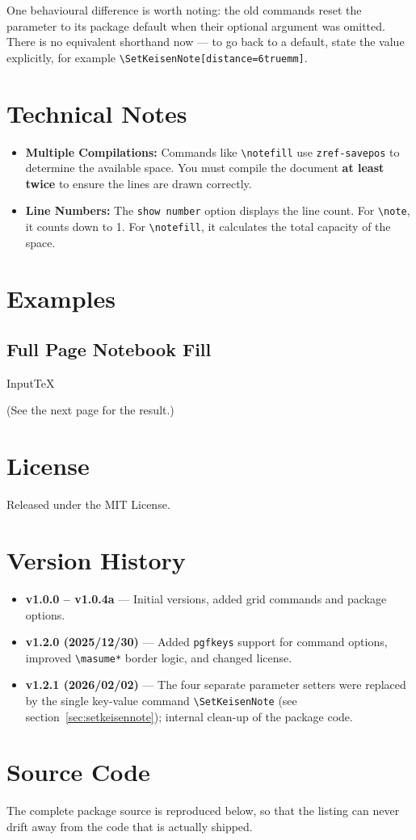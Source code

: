 \documentclass[luatex,fontsize=8pt,paper=b5,twoside]{jlreq}%
\begin{document}
One behavioural difference is worth noting: the old commands reset the parameter to
its package default when their optional argument was omitted. There is no equivalent
shorthand now --- to go back to a default, state the value explicitly, for example
\texttt{\textbackslash SetKeisenNote[distance=6truemm]}.

\section{Technical Notes}
\begin{itemize}
  \item \textbf{Multiple Compilations:} Commands like \texttt{\textbackslash notefill} use \texttt{zref-savepos} to determine the available space. You must compile the document \textbf{at least twice} to ensure the lines are drawn correctly.
  \item \textbf{Line Numbers:} The \texttt{show number} option displays the line count. For \texttt{\textbackslash note}, it counts down to 1. For \texttt{\textbackslash notefill}, it calculates the total capacity of the space.
\end{itemize}

\section{Examples}

\subsection{Full Page Notebook Fill}
\begin{SourceCode}{Input}{TeX}
  \notefill[color=lightgray, show number=true]
\end{SourceCode}
(See the next page for the result.)
\newpage
\notefill[color=lightgray, show number=true]

\newpage

\section{License}
Released under the MIT License.

\section{Version History}
\begin{itemize}
  \item \textbf{v1.0.0 -- v1.0.4a} --- Initial versions, added grid commands and package options.
  \item \textbf{v1.2.0 (2025/12/30)} --- Added \texttt{pgfkeys} support for command options, improved \texttt{\textbackslash masume*} border logic, and changed license.
  \item \textbf{v1.2.1 (2026/02/02)} --- The four separate parameter setters were replaced by the single key-value command \texttt{\textbackslash SetKeisenNote} (see section~\ref{sec:setkeisennote}); internal clean-up of the package code.
\end{itemize}

\section{Source Code}
The complete package source is reproduced below, so that the listing can never
drift away from the code that is actually shipped.


\end{document}

